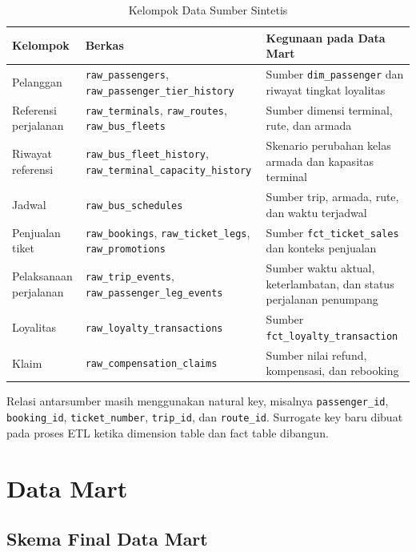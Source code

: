 \begin{table}[htbp]
\centering
\small
\caption{Kelompok Data Sumber Sintetis}
\label{tab:kelompok-data-sumber}
\begin{tabular}{|p{}|p{}|p{}|}
\hline
\textbf{Kelompok} & \textbf{Berkas} & \textbf{Kegunaan pada Data Mart} \\
\hline
Pelanggan & \texttt{raw\_passengers},
\texttt{raw\_passenger\_tier\_history} & Sumber
\texttt{dim\_passenger} dan riwayat tingkat loyalitas \\
\hline
Referensi perjalanan & \texttt{raw\_terminals}, \texttt{raw\_routes},
\texttt{raw\_bus\_fleets} & Sumber dimensi terminal, rute, dan armada \\
\hline
Riwayat referensi & \texttt{raw\_bus\_fleet\_history},
\texttt{raw\_terminal\_capacity\_history} & Skenario perubahan kelas armada
dan kapasitas terminal \\
\hline
Jadwal & \texttt{raw\_bus\_schedules} & Sumber trip, armada, rute, dan waktu
terjadwal \\
\hline
Penjualan tiket & \texttt{raw\_bookings}, \texttt{raw\_ticket\_legs},
\texttt{raw\_promotions} & Sumber \texttt{fct\_ticket\_sales} dan konteks
penjualan \\
\hline
Pelaksanaan perjalanan & \texttt{raw\_trip\_events},
\texttt{raw\_passenger\_leg\_events} & Sumber waktu aktual, keterlambatan,
dan status perjalanan penumpang \\
\hline
Loyalitas & \texttt{raw\_loyalty\_transactions} & Sumber
\texttt{fct\_loyalty\_transaction} \\
\hline
Klaim & \texttt{raw\_compensation\_claims} & Sumber nilai refund,
kompensasi, dan rebooking \\
\hline
\end{tabular}
\end{table}

Relasi antarsumber masih menggunakan natural key, misalnya
\texttt{passenger\_id}, \texttt{booking\_id}, \texttt{ticket\_number},
\texttt{trip\_id}, dan \texttt{route\_id}. Surrogate key baru dibuat pada proses
ETL ketika dimension table dan fact table dibangun.

\section{Data Mart}
\subsection{Skema Final Data Mart}

